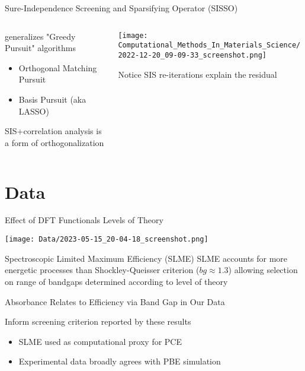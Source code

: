 \documentclass[10pt, aspectratio=169, presentation]{beamer}
\begin{document}
\begin{frame}[label={sec:org0fd7a91}]{Sure-Independence Screening and Sparsifying Operator (SISSO)}
\begin{columns}
\begin{column}{0.4\columnwidth}
generalizes "Greedy Pursuit" algorithms
\begin{itemize}
\item Orthogonal Matching Pursuit
\item Basis Pursuit (aka LASSO)
\end{itemize}

SIS+correlation analysis is a form of orthogonalization
\end{column}

\begin{column}{0.6\columnwidth}
\begin{center}
\texttt{[image: Computational\_Methods\_In\_Materials\_Science/2022-12-20\_09-09-33\_screenshot.png]}
\end{center}
Notice SIS re-iterations explain the residual\autocite{ghiringhelli-2017-learn-physic}
\end{column}
\end{columns}
\end{frame}

\section{Data}
\label{sec:org48e5261}
\begin{frame}[label={sec:org5683353}]{Effect of DFT Functionals Levels of Theory}
\begin{center}
\texttt{[image: Data/2023-05-15\_20-04-18\_screenshot.png]}
\end{center}
\end{frame}

\begin{frame}[label={sec:orgf79f465}]{Spectroscopic Limited Maximum Efficiency (SLME)}
SLME accounts for more energetic processes than Shockley-Queisser
criterion (\(bg \approx 1.3\)) allowing selection on range of bandgaps
determined according to level of theory\autocite[p.1]{yu-2012-ident-poten}
\end{frame}

\begin{frame}[label={sec:orgd1ff410}]{Absorbance Relates to Efficiency via Band Gap in Our Data}
 
\begin{center}

\end{center}

Inform screening criterion reported by these results\autocite{yang-2023-high-throug} 
\begin{itemize}
\item SLME used as computational proxy for PCE
\item Experimental data\autocite{almora-2020-devic-perfor} broadly agrees with PBE simulation
\end{itemize}
\end{frame}
\end{document}
